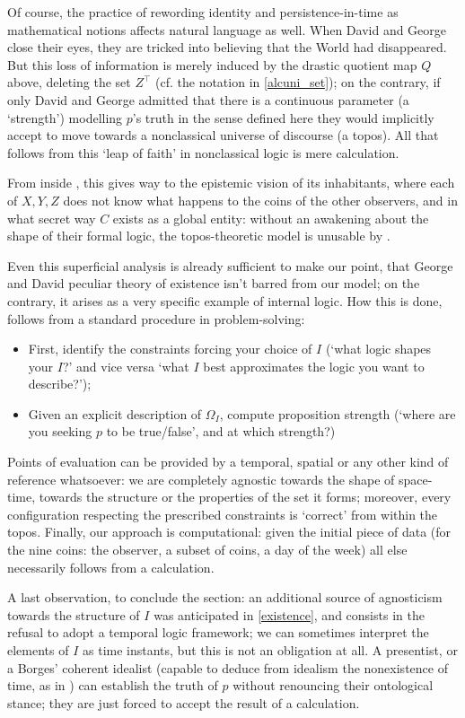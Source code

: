 Of course, the practice of rewording identity and persistence-in-time as mathematical notions affects natural language as well. When David and George close their eyes, they are tricked into believing that the World had disappeared. But this loss of information is merely induced by the drastic quotient map $Q$ above, deleting the set $Z^\top$ (cf. the notation in \autoref{alcuni_set}); on the contrary, if only David and George admitted that there is a continuous parameter (a `strength') modelling $p$'s truth in the sense defined here they would implicitly accept to move towards a nonclassical universe of discourse (a topos). All that follows from this `leap of faith' in nonclassical logic is mere calculation.

From inside \tlon, this gives way to the epistemic vision of its inhabitants, where each of $X,Y,Z$ does not know what happens to the coins of the other observers, and in what secret way $C$ exists as a global entity: without an awakening about the shape of their formal logic, the topos-theoretic model is unusable by \tlonians.

Even this superficial analysis is already sufficient to make our point, that George and David peculiar theory of existence isn't barred from our model; on the contrary, it arises as a very specific example of internal logic. How this is done, follows from a standard procedure in problem-solving:
\begin{itemize}
	\item First, identify the constraints forcing your choice of $I$ (`what logic shapes your $I$?' and vice versa `what $I$ best approximates the logic you want to describe?');
	\item Given an explicit description of $\Omega_I$, compute proposition strength (`where are you seeking $p$ to be true/false', and at which strength?)
\end{itemize}
Points of evaluation can be provided by a temporal, spatial or any other kind of reference whatsoever: we are completely agnostic towards the shape of space-time, towards the structure or the properties of the set it forms; moreover, every configuration respecting the prescribed constraints is `correct' from within the topos. Finally, our approach is computational: given the initial piece of data (for the nine coins: the observer, a subset of coins, a day of the week) all else necessarily follows from a calculation.

A last observation, to conclude the section: an additional source of agnosticism towards the structure of $I$ was anticipated in \autoref{existence}, and consists in the refusal to adopt a temporal logic framework; we can sometimes interpret the elements of $I$ as time instants, but this is not an obligation at all. A presentist, or a Borges' coherent idealist (capable to deduce from idealism the nonexistence of time, as in \cite{confutacion}) can establish the truth of $p$ without renouncing their ontological stance; they are just forced to accept the result of a calculation.


